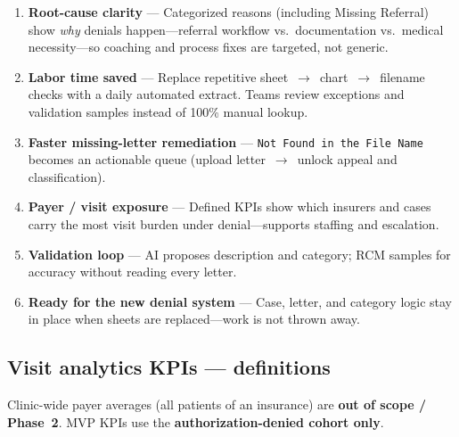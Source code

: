 \documentclass[11pt,a4paper]{article}
\begin{document}
\begin{tcolorbox}[successbox,title={What this solution unlocks}]
\begin{enumerate}
  \item \textbf{Root-cause clarity} --- Categorized reasons (including Missing Referral)
        show \emph{why} denials happen---referral workflow vs.\ documentation vs.\ medical
        necessity---so coaching and process fixes are targeted, not generic.
  \item \textbf{Labor time saved} --- Replace repetitive sheet~$\rightarrow$~chart~$\rightarrow$~filename
        checks with a daily automated extract. Teams review exceptions and validation
        samples instead of 100\% manual lookup.
  \item \textbf{Faster missing-letter remediation} ---
        \texttt{Not Found in the File Name} becomes an actionable queue
        (upload letter~$\rightarrow$~unlock appeal and classification).
  \item \textbf{Payer / visit exposure} --- Defined KPIs show which insurers and cases
        carry the most visit burden under denial---supports staffing and escalation.
  \item \textbf{Validation loop} --- AI proposes description and category; RCM samples
        for accuracy without reading every letter.
  \item \textbf{Ready for the new denial system} --- Case, letter, and category logic stay
        in place when sheets are replaced---work is not thrown away.
\end{enumerate}
\end{tcolorbox}

\subsection{Visit analytics KPIs --- definitions}

Clinic-wide payer averages (all patients of an insurance) are \textbf{out of scope /
Phase~2}. MVP KPIs use the \textbf{authorization-denied cohort only}.
\end{document}
